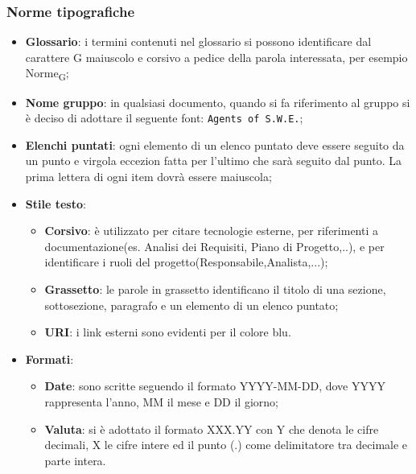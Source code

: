 
\subsubsection{Norme tipografiche}
\begin{itemize}
	\item \textbf{Glossario}: i termini contenuti nel glossario si possono identificare dal carattere G maiuscolo e corsivo a pedice della parola interessata, per esempio Norme\textsubscript{G};	 		
	\item \textbf{Nome gruppo}: in qualsiasi documento, quando si fa riferimento al gruppo si è deciso di adottare il seguente font: \texttt{Agents of S.W.E.};
	\item \textbf{Elenchi puntati}: ogni elemento di un elenco puntato deve essere seguito da un punto e virgola eccezion fatta per l'ultimo che sarà seguito dal punto. La prima lettera di ogni item dovrà essere maiuscola;
	\item \textbf{Stile testo}:
	\begin{itemize}
		\item \textbf{Corsivo}: è utilizzato per citare tecnologie esterne, per riferimenti a documentazione(es. Analisi dei Requisiti, Piano di Progetto,..), e per identificare i ruoli del progetto(Responsabile,Analista,...);	
		\item \textbf{Grassetto}: le parole in grassetto identificano il titolo di una sezione, sottosezione, paragrafo e un elemento di un elenco puntato;
		\item \textbf{URI}:	i link esterni sono evidenti per il colore blu.
	\end{itemize}
	\item \textbf{Formati}:
	\begin{itemize}
		\item \textbf{Date}: sono scritte seguendo il formato YYYY-MM-DD, dove YYYY rappresenta l'anno, MM il mese e DD il giorno;
		\item \textbf{Valuta}: si è adottato il formato XXX.YY con Y che denota le cifre decimali, X le cifre intere ed il punto (.) come delimitatore tra decimale e parte intera.
	\end{itemize}
\end{itemize}


